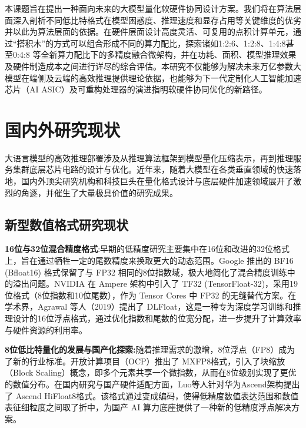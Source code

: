 \documentclass[10.5pt,compsoc,UTF8]{CjC}
\theoremstyle{mystyle}
\begin{document}
本课题旨在提出一种面向未来的大模型量化软硬件协同设计方案。我们将在算法层面深入剖析不同低比特格式在模型困惑度、推理速度和显存占用等关键维度的优劣并以此为算法层面的依据。在硬件层面设计高度灵活、可复用的点积计算单元，通过“搭积木”的方式可以组合形成不同的算力配比，探索诸如1:2:6、1:2:8、1:4:8甚至0:4:8 等全新算力配比下的多精度融合微架构，并在功耗、面积、模型推理效果及硬件制造成本之间进行详尽的综合评估。本研究不仅能够为解决未来万亿参数大模型在端侧及云端的高效推理提供理论依据，也能够为下一代定制化人工智能加速芯片（AI ASIC）及可重构处理器的演进指明软硬件协同优化的新路径。


\section{国内外研究现状}
大语言模型的高效推理部署涉及从推理算法框架到模型量化压缩表示，再到推理服务集群底层芯片电路的设计与优化。近年来，随着大模型在各类垂直领域的快速落地，国内外顶尖研究机构和科技巨头在量化格式设计与底层硬件加速领域展开了激烈的角逐，并催生了大量极具价值的研究成果。
\subsection{新型数值格式研究现状}
\textbf{16位与32位混合精度格式}:早期的低精度研究主要集中在16位和改进的32位格式上，旨在通过牺牲一定的尾数精度来换取更大的动态范围。Google 推出的 BF16\cite{burgess2019bfloat16} (Bfloat16) 格式保留了与 FP32 相同的8位指数域，极大地简化了混合精度训练中的溢出问题。NVIDIA 在 Ampere 架构中引入了 TF32\cite{TF32} (TensorFloat-32)，采用19位格式（8位指数和10位尾数），作为 Tensor Cores 中 FP32 的无缝替代方案。在学术界，Agrawal 等人（2019）提出了 DLFloat\cite{agrawal2019dlfloat}，这是一种专为深度学习训练和推理设计的16位浮点格式，通过优化指数和尾数的位宽分配，进一步提升了计算效率与硬件资源的利用率。

\textbf{8位低比特量化的发展与国产化探索:}随着推理需求的激增，8位浮点（FP8）成为了新的行业标准。开放计算项目（OCP）推出了 MXFP8\cite{rouhani2023microscaling}格式，引入了块缩放（Block Scaling）概念，即多个元素共享一个微指数，从而在8位级别实现了更优的数值分布。在国内研究与国产硬件适配方面，Luo等人针对华为Ascend架构提出了 Ascend HiFloat8\cite{hifloat8}格式。该格式通过变成编码，使得低精度数值表达范围和数值表征细粒度之间取了折中，为国产 AI 算力底座提供了一种新的低精度浮点解决方案。
\end{document}
